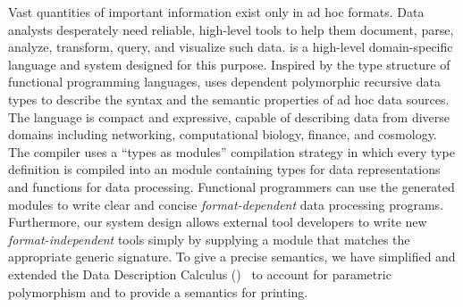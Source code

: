 Vast quantities of important information exist only in ad hoc formats.  
Data analysts desperately need reliable, high-level tools to 
help them document, parse, analyze, transform, query, and visualize such data.  
\padsml{} is a high-level domain-specific language and system
designed for this purpose.  
Inspired by the type structure of functional
programming languages, \padsml{} uses dependent
polymorphic recursive data types to describe the syntax and the semantic properties of ad hoc data sources.  The language is compact and expressive, capable of describing data from diverse domains including networking, computational biology, finance, and cosmology. 
The \padsml{} compiler uses a ``types as modules'' compilation strategy
in which every \padsml{} type definition is compiled into
an \ocaml{} module containing types for data representations
and functions for data processing.  Functional programmers
can use the generated modules to write clear and concise {\em format-dependent}
data processing programs.  Furthermore, our system design
allows external tool developers to write new {\em format-independent} tools
simply by supplying a module that matches the appropriate generic
signature.  
To give \padsml{} a precise semantics, we have simplified and extended the Data Description Calculus (\ddc)~\cite{fisher+:next700ddl} to account for parametric polymorphism and to provide a semantics for printing.


